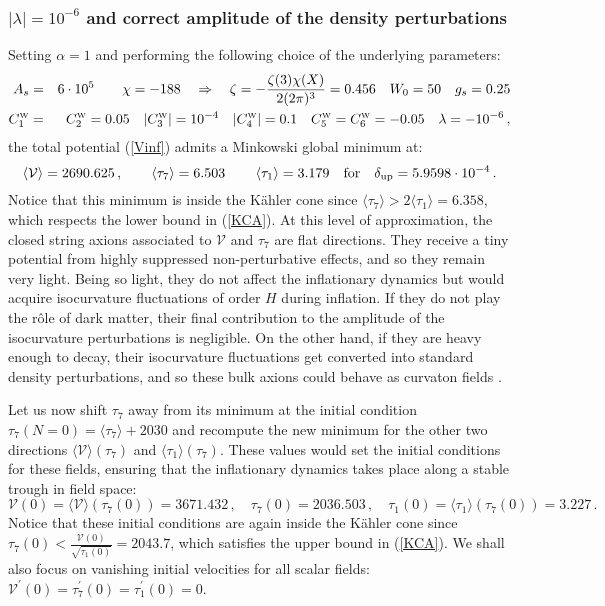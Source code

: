\documentclass[11pt,a4paper]{article}
\newcommand{\bea}{\begin{eqnarray}}
\newcommand{\eea}{\end{eqnarray}}
\newcommand{\be}{\begin{equation}}
\newcommand{\ee}{\end{equation}}
\def\nn{\nonumber}
\def\W{{\scriptscriptstyle \rm W}}
\newcommand\vo{{\mathcal{V}}}
\begin{document}
\subsubsection{$|\lambda| = 10^{-6}$ and correct amplitude of the density perturbations}
\label{GreatCase}

Setting $\alpha=1$ and performing the following choice of the underlying parameters:
\bea
A_s &=& 6\cdot 10^5 \qquad \chi=-188 \quad\Rightarrow \quad \zeta = -\frac{\zeta(3) \chi(X)}{2 (2\pi)^3} = 0.456 \quad W_0 = 50 \quad g_s = 0.25 \nn \\
C_1^\W &=& C_2^\W = 0.05 \quad |C_3^\W| = 10^{-4} \quad |C_4^\W| = 0.1 \quad C_5^\W=C_6^\W = -0.05 \quad \lambda = -10^{-6}\,, \nn
\eea
the total potential (\ref{Vinf}) admits a Minkowski global minimum at:
\be
\langle \vo\rangle = 2690.625\,,\qquad \langle\tau_7\rangle = 6.503\,\qquad \langle \tau_1\rangle = 3.179\quad\text{for}\quad 
\delta_{\rm up} = 5.9598\cdot 10^{-4}\,. \nn
\ee
Notice that this minimum is inside the K\"ahler cone since $\langle\tau_7\rangle > 2\langle\tau_1\rangle = 6.358$, which respects the lower bound in (\ref{KCA}). At this level of approximation, the closed string axions associated to $\vo$ and $\tau_7$ are flat directions. They receive a tiny potential from highly suppressed non-perturbative effects, and so they remain very light. Being so light, they do not affect the inflationary dynamics but would acquire isocurvature fluctuations of order $H$ during inflation. If they do not play the r\^ole of dark matter, their final contribution to the amplitude of the isocurvature perturbations is negligible. On the other hand, if they are heavy enough to decay, their isocurvature fluctuations get converted into standard density perturbations, and so these bulk axions could behave as curvaton fields \cite{curvaton}.

Let us now shift $\tau_7$ away from its minimum at the initial condition $\tau_7 (N=0) = \langle\tau_7\rangle + 2030$ and recompute the new minimum for the other two directions $\langle \vo\rangle(\tau_7)$ and $\langle\tau_1\rangle(\tau_7)$. These values would set the initial conditions for these fields, ensuring that the inflationary dynamics takes place along a stable trough in field space:
\be
\vo(0) = \langle \vo\rangle (\tau_7(0)) = 3671.432\,,\quad \tau_7(0) = 2036.503\,,
\quad\tau_1(0) = \langle \tau_1\rangle(\tau_7(0)) = 3.227 \,. \nn
\ee
Notice that these initial conditions are again inside the K\"ahler cone since $\tau_7(0) < \frac{\vo(0)}{\sqrt{\tau_1(0)}} = 2043.7$, which satisfies the upper bound in (\ref{KCA}). We shall also focus on vanishing initial velocities for all scalar fields: $\vo^\prime (0) = \tau_7^\prime (0) = \tau_1^\prime(0) = 0$.
\end{document}
